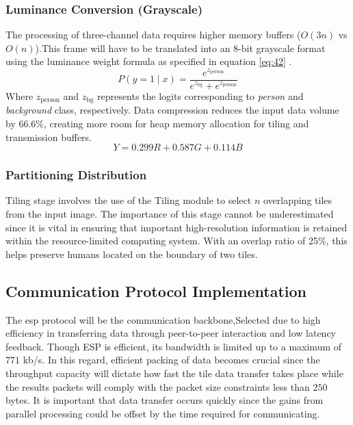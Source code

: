\subsubsection{\textbf{Luminance Conversion (Grayscale)}}
The processing of three-channel data requires higher memory buffers  ($O(3n)$ vs $O(n)$).This frame will have to be translated into an 8-bit grayscale format using the luminance weight formula as specified in equation \eqref{eq:42}  \cite{itu2011bt601}.
\begin{equation}
    \label{eq:42}
    P(y = 1 \mid x) = \frac{e^{z_{\text{person}}}}{e^{z_{\text{bg}}} + e^{z_{\text{person}}}}
\end{equation}
Where $z_{\text{person}}$ and $z_{\text{bg}}$ represents the logits corresponding to \textit{person} and \textit{background} class,
respectively. Data compression reduces the input data volume by 66.6\%, creating more room for heap memory allocation for tiling and transmission buffers.
\begin{equation}
    \label{eq:greyscale}
    Y = 0.299R + 0.587G + 0.114B
\end{equation}
\subsubsection{\textbf{Partitioning Distribution}}
Tiling stage involves the use of the Tiling module to select $n$ overlapping tiles from the input image. The importance of this stage cannot be underestimated since it is vital in ensuring that important high-resolution information is retained within the resource-limited computing system. With an overlap ratio of 25\%, this helps preserve humans located on the boundary of two tiles.

\subsection{Communication Protocol Implementation}
The \gls{esp} protocol will be the communication backbone\cite{espnow_doc},Selected due to high efficiency in transferring data through peer-to-peer interaction and low latency feedback. Though ESP is efficient, its bandwidth is limited up to a maximum of $771$ \gls{kb}/s. In this regard, efficient packing of data becomes crucial since the throughput capacity will dictate how fast the tile data transfer takes place while the results packets will comply with the packet size constraints less than $250$ bytes. It is important that data transfer occurs quickly since the gains from parallel processing could be offset by the time required for communicating.


